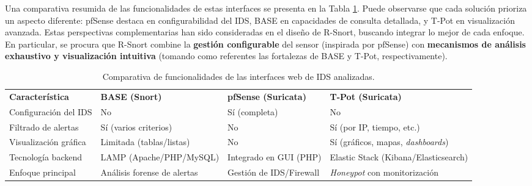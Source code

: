 \documentclass[11pt,a4paper,twoside]{report}
\begin{document}
\vspace{1em}
\noindent Una comparativa resumida de las funcionalidades de estas interfaces se presenta en la Tabla \ref{tab:comparativa-interfaces}. Puede observarse que cada solución prioriza un aspecto diferente: pfSense destaca en configurabilidad del IDS, BASE en capacidades de consulta detallada, y T-Pot en visualización avanzada. Estas perspectivas complementarias han sido consideradas en el diseño de R-Snort, buscando integrar lo mejor de cada enfoque. En particular, se procura que R-Snort combine la \textbf{gestión configurable} del sensor (inspirada por pfSense) con \textbf{mecanismos de análisis exhaustivo y visualización intuitiva} (tomando como referentes las fortalezas de BASE y T-Pot, respectivamente).\newline

\begin{table}[hbtp]
	\centering
	\renewcommand{\arraystretch}{1.6}
	\setlength{\tabcolsep}{8pt}
	
	\begin{tabularx}{\textwidth}{|>{\centering\arraybackslash}X||>{\centering\arraybackslash}X||>{\centering\arraybackslash}X||>{\centering\arraybackslash}X|}
		\hline
		\rowcolor[gray]{0.85}
		\textbf{Característica} & \textbf{BASE (Snort)} & \textbf{pfSense (Suricata)} & \textbf{T-Pot (Suricata)} \\
		\hhline{|====|} %
		
		Configuración del IDS  & No                    & Sí (completa)           & No                               \\ \hline
		Filtrado de alertas    & Sí (varios criterios) & No                       & Sí (por IP, tiempo, etc.)         \\ \hline
		Visualización gráfica  & Limitada (tablas/listas) & No                    & Sí (gráficos, mapas, \emph{dashboards}) \\ \hline
		Tecnología backend     & LAMP (Apache/PHP/MySQL)  & Integrado en GUI (PHP) & Elastic Stack (Kibana/Elasticsearch)    \\ \hline
		Enfoque principal      & Análisis forense de alertas & Gestión de IDS/Firewall & \emph{Honeypot} con monitorización \\ \hline
	\end{tabularx}
	
	\caption{Comparativa de funcionalidades de las interfaces web de IDS analizadas.}
	\label{tab:comparativa-interfaces}
\end{table}
\end{document}

